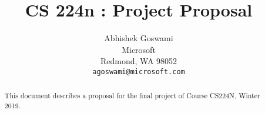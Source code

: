 \documentclass{article}
\title{CS 224n : Project Proposal}
\author{%
	Abhishek Goswami\\
  Microsoft\\
  Redmond, WA 98052 \\
  \texttt{agoswami@microsoft.com} \\
}
\begin{document}

\maketitle

\begin{abstract}
  This document describes a proposal for the final project of Course CS224N, Winter 2019.
\end{abstract}




%
%
%
%



\end{document}
